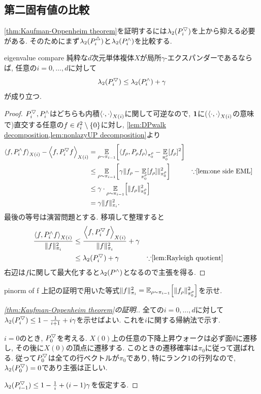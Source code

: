 \subsection{第二固有値の比較}
\cref{thm:Kaufman-Oppenheim theorem}を証明するには$\lambda_2(P^{\bigtriangledown}_i)$を上から抑える必要がある.
そのためにまず$\lambda_2(P^{\triangle}_i)$と$\lambda_2(P^{\land}_i)$を比較する.
\begin{lemma}{}{eigenvalue compare}
    純粋な$d$次元単体複体$X$が局所$\gamma$-エクスパンダーであるならば, 任意の$i=0,\dots,d$に対して
    \[ \lambda_2(P^{\bigtriangledown}_i) \le \lambda_2(P^{\land}_i) + \gamma \]
    が成り立つ.
\end{lemma}
\begin{proof}
    $P^{\bigtriangledown}_i,P^{\land}_i$はどちらも内積$\left\langle\cdot,\cdot\right\rangle_{X(i)}$に関して可逆なので,
    $\mathbf{1}$に($\left\langle\cdot,\cdot\right\rangle_{X(i)}$の意味で)直交する任意の$f \in \ell^2_{i} \setminus\{0\}$に対し,
    \cref{lem:DPwalk decomposition,lem:nonlazyUP decomposition}より
    \begin{align*}
        \iprod{f,\nonlazyPUD_i f} - \iprod{f,\PDU_i f} &= \E_{\rho\sim\pi_{i-1}}\sbra*{ \abra*{f_\rho, P_\rho f_\rho}_{\pi_0^\rho} - \E_{\pi^\rho_0}[f_\rho]^2}  \\
        & \le \E_{\rho\sim\pi_{i-1}}\sbra*{\gamma \norm{f_\rho - \E_{\pi^\rho_0}[f_\rho]}_{\pi^\rho_0}^2 } & & \text{$\because$\cref{lem:one side EML}} \\
        &\le \gamma \cdot \E_{\rho\sim\pi_{i-1}}\sbra*{\norm{f_\rho}^2_{\pi^\rho_0}} \\
        &= \gamma \norm{f}^2_{\pi_i}.
    \end{align*}
    最後の等号は演習問題とする.
    移項して整理すると
    \begin{align*}
        \frac{\iprod{f,\nonlazyPUD_i f}}{\norm{f}_{\pi_i}^2} &\le \frac{\iprod{f,\PDU_if}}{\norm{f}^2_{\pi_i}} + \gamma \\
        & \le \lambda_2(\PDU_i) + \gamma & & \text{$\because$\cref{lem:Rayleigh quotient}}
    \end{align*}
    右辺は$f$に関して最大化すると$\lambda_2(P^{\land})$となるので主張を得る.
\end{proof}

\begin{exercise}{}{pinorm of f}
    上記の証明で用いた等式$\norm{f}_{\pi_i}^2  = \E_{\rho \sim \pi_{i-1}}\sbra*{\norm{f_\rho}^2_{\pi^\rho_0}}$を示せ.
\end{exercise}

\begin{proof}[\cref{thm:Kaufman-Oppenheim theorem}の証明.]
    全ての$i=0,\dots,d$に対して$\lambda_2(P^{\bigtriangledown}_i) \le 1-\frac{1}{i+1} + i\gamma$を示せばよい.
    これを$i$に関する帰納法で示す.

    $i=0$のとき, $P^{\bigtriangledown}_0$を考える.
    $X(0)$上の任意の下降上昇ウォークは必ず面$\emptyset$に遷移し, その後に$X(0)$の頂点に遷移する.
    このときの遷移確率は$\pi_0$に従って選ばれる.
    従って$P^{\bigtriangledown}_0$は全ての行ベクトルが$\pi_0$であり, 特にランク$1$の行列なので, $\lambda_2(P^{\bigtriangledown}_0)=0$であり主張は正しい.

    $\lambda_2(P^{\bigtriangledown}_{i-1}) \le 1-\frac{1}{i} + (i-1)\gamma$を仮定する.
    
\end{proof}

